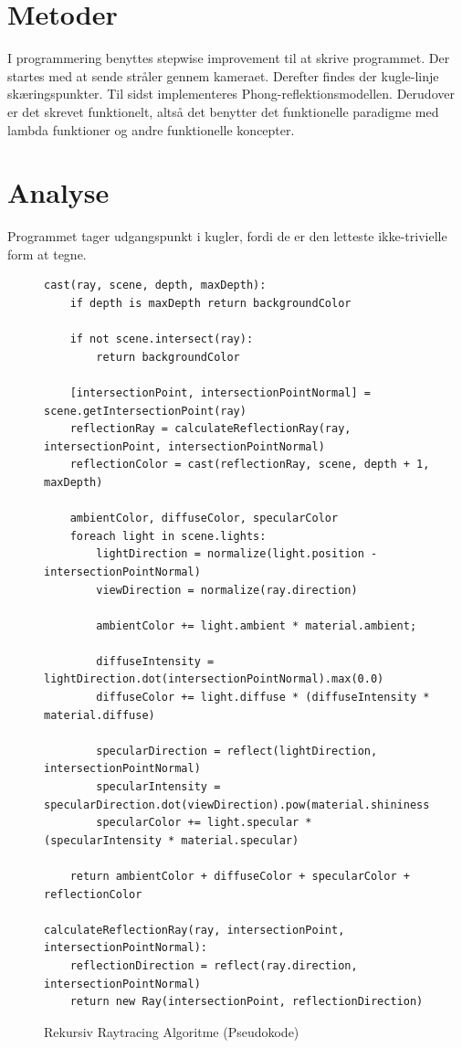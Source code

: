 \documentclass{article}
\begin{document}
\begin{flushleft}
    \section{Metoder}
    I programmering benyttes stepwise improvement til at skrive programmet. Der startes med at sende stråler gennem kameraet.
    Derefter findes der kugle-linje skæringspunkter. Til sidst implementeres Phong-reflektionsmodellen.
    Derudover er det skrevet funktionelt, altså det benytter det funktionelle paradigme med lambda funktioner
    og andre funktionelle koncepter.

    \section{Analyse}

    Programmet tager udgangspunkt i kugler, fordi de er den letteste ikke-trivielle form at tegne.

    \begin{figure}[H]
        \centering
        \begin{verbatim}
cast(ray, scene, depth, maxDepth):
    if depth is maxDepth return backgroundColor

    if not scene.intersect(ray):
        return backgroundColor
    
    [intersectionPoint, intersectionPointNormal] = scene.getIntersectionPoint(ray)
    reflectionRay = calculateReflectionRay(ray, intersectionPoint, intersectionPointNormal)
    reflectionColor = cast(reflectionRay, scene, depth + 1, maxDepth)

    ambientColor, diffuseColor, specularColor
    foreach light in scene.lights:
        lightDirection = normalize(light.position - intersectionPointNormal)
        viewDirection = normalize(ray.direction)

        ambientColor += light.ambient * material.ambient;

        diffuseIntensity = lightDirection.dot(intersectionPointNormal).max(0.0)
        diffuseColor += light.diffuse * (diffuseIntensity * material.diffuse)

        specularDirection = reflect(lightDirection, intersectionPointNormal)
        specularIntensity = specularDirection.dot(viewDirection).pow(material.shininess)
        specularColor += light.specular * (specularIntensity * material.specular)

    return ambientColor + diffuseColor + specularColor + reflectionColor

calculateReflectionRay(ray, intersectionPoint, intersectionPointNormal):
    reflectionDirection = reflect(ray.direction, intersectionPointNormal)
    return new Ray(intersectionPoint, reflectionDirection)
        \end{verbatim}
        \caption{Rekursiv Raytracing Algoritme (Pseudokode)}
    \end{figure}


\end{flushleft}
\end{document}
